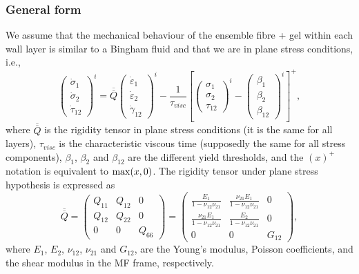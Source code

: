 \documentclass[]{article}
\begin{document}
\subsubsection{General form}
We assume that the mechanical behaviour of the ensemble fibre + gel within each wall layer is similar to a Bingham fluid and that we are in plane stress conditions, i.e.,
\begin{equation}\label{constitutive}
	\boxed{
		\left(\begin{matrix}
		\dot{\sigma}_1\\
		\dot{\sigma}_2\\
		\dot{\tau}_{12}
	\end{matrix}\right)^i
=
\overline{\overline{Q}}
	\left(\begin{matrix}
	\dot{\varepsilon}_1\\
	\dot{\varepsilon}_2\\
	\dot{\gamma}_{12}
\end{matrix}\right)^i
- \frac{1}{\tau_{visc}}	
\left[
\left(\begin{matrix}
	{\sigma}_1\\
	{\sigma}_2\\
	{\tau}_{12}
\end{matrix}\right)^i
-
\left(\begin{matrix}
	\beta_1\\
	\beta_2\\
	\beta_{12}
\end{matrix}\right)^i
\right]^+},
\end{equation}
where $\overline{\overline{Q}}$ is the rigidity tensor in plane stress conditions (it is the same for all layers), $\tau_{visc}$ is the characteristic viscous time (supposedly the same for all stress components), $\beta_1$, $\beta_2$ and $\beta_{12}$ are the different yield thresholds, and the $(x)^+$ notation is equivalent to ${\rm max} (x,0)$.
The rigidity tensor under plane stress hypothesis is expressed as
\begin{equation}
	\overline{\overline{Q}}=
	\left(\begin{matrix}
		Q_{11} & Q_{12} & 0\\
		Q_{12} & Q_{22} & 0\\
		0 & 0 & Q_{66}
	\end{matrix}\right)=
	\left(\begin{matrix}
	\frac{E_1}{1-\nu_{12}\nu_{21}} & \frac{\nu_{21}E_1}{1-\nu_{12}\nu_{21}} & 0\\
	\frac{\nu_{21}E_1}{1-\nu_{12}\nu_{21}} & \frac{E_2}{1-\nu_{12}\nu_{21}} & 0\\
	0 & 0 & G_{12}
\end{matrix}\right),
\end{equation}
where $E_1$, $E_2$, $\nu_{12}$, $\nu_{21}$ and $G_{12}$, are the Young's modulus, Poisson coefficients, and the shear modulus in the MF frame, respectively.
\end{document}
